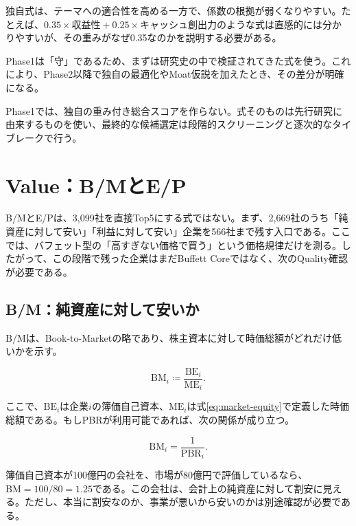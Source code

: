 \documentclass[11pt,a4paper]{article}
\newcommand{\BE}{\mathrm{BE}}
\newcommand{\ME}{\mathrm{ME}}
\newcommand{\BMratio}{\mathrm{B/M}}
\begin{document}
独自式は、テーマへの適合性を高める一方で、係数の根拠が弱くなりやすい。たとえば、$0.35\times\text{収益性}+0.25\times\text{キャッシュ創出力}$のような式は直感的には分かりやすいが、その重みがなぜ0.35なのかを説明する必要がある。

Phase1は「守」であるため、まずは研究史の中で検証されてきた式を使う。これにより、Phase2以降で独自の最適化やMoat仮説を加えたとき、その差分が明確になる。

\begin{keybox}
Phase1では、独自の重み付き総合スコアを作らない。式そのものは先行研究に由来するものを使い、最終的な候補選定は段階的スクリーニングと逐次的なタイブレークで行う。
\end{keybox}

\clearpage
\section{Value：B/MとE/P}
\begin{keybox}
B/MとE/Pは、3,099社を直接Top5にする式ではない。まず、2,669社のうち「純資産に対して安い」「利益に対して安い」企業を566社まで残す入口である。ここでは、バフェット型の「高すぎない価格で買う」という価格規律だけを測る。したがって、この段階で残った企業はまだBuffett Coreではなく、次のQuality確認が必要である。
\end{keybox}

\subsection{B/M：純資産に対して安いか}

$\BMratio$は、Book-to-Marketの略であり、株主資本に対して時価総額がどれだけ低いかを示す。

\begin{equation}
\mathrm{BM}_i \coloneqq \frac{\BE_i}{\ME_i}.
\label{eq:bm}
\end{equation}

ここで、$\BE_i$は企業$i$の簿価自己資本、$\ME_i$は式\eqref{eq:market-equity}で定義した時価総額である。もしPBRが利用可能であれば、次の関係が成り立つ。

\begin{equation}
\mathrm{BM}_i = \frac{1}{\mathrm{PBR}_i}.
\label{eq:bm-pbr}
\end{equation}

\begin{defbox}[直感]
簿価自己資本が100億円の会社を、市場が80億円で評価しているなら、$\mathrm{BM}=100/80=1.25$である。この会社は、会計上の純資産に対して割安に見える。ただし、本当に割安なのか、事業が悪いから安いのかは別途確認が必要である。
\end{defbox}
\end{document}

